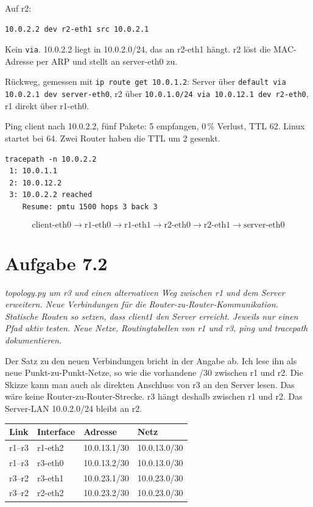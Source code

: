 \documentclass[a4paper,11pt]{article}
\newif\ifexplain
\newcommand{\aufgabe}[1]{\section*{Aufgabe #1}}
\newcommand{\angabe}[1]{{\raggedright\textit{#1}\par}\smallskip}
\newcommand{\explain}[1]{\ifexplain\begin{erklbox}#1\end{erklbox}\fi}
\begin{document}
Auf r2:
\begin{lstlisting}
10.0.2.2 dev r2-eth1 src 10.0.2.1
\end{lstlisting}
Kein \texttt{via}. 10.0.2.2 liegt in 10.0.2.0/24, das an r2-eth1 hängt. r2 löst die MAC-Adresse per ARP und stellt an server-eth0 zu.

Rückweg, gemessen mit \texttt{ip route get 10.0.1.2}: Server über \texttt{default via 10.0.2.1 dev server-eth0}, r2 über \texttt{10.0.1.0/24 via 10.0.12.1 dev r2-eth0}, r1 direkt über r1-eth0.

Ping client nach 10.0.2.2, fünf Pakete: 5 empfangen, 0\,\% Verlust, TTL 62. Linux startet bei 64. Zwei Router haben die TTL um 2 gesenkt.
\begin{lstlisting}
tracepath -n 10.0.2.2
 1: 10.0.1.1
 2: 10.0.12.2
 3: 10.0.2.2 reached
    Resume: pmtu 1500 hops 3 back 3
\end{lstlisting}

\explain{TTL 62 und drei tracepath-Zeilen sagen dasselbe: Client, dann r1, dann r2, dann Server. 10.0.12.2 ist r2-eth0, also der Next Hop, den r1 gewählt hat. Wäre die Route auf r1 falsch, käme der zweite Hop woanders her oder der Ping käme mit Unreachable zurück.}

\[
\boxed{\text{client-eth0}\to\text{r1-eth0}\to\text{r1-eth1}\to\text{r2-eth0}\to\text{r2-eth1}\to\text{server-eth0}}
\]

\aufgabe{7.2}
\angabe{topology.py um r3 und einen alternativen Weg zwischen r1 und dem Server erweitern. Neue Verbindungen für die Router-zu-Router-Kommunikation. Statische Routen so setzen, dass client1 den Server erreicht. Jeweils nur einen Pfad aktiv testen. Neue Netze, Routingtabellen von r1 und r3, ping und tracepath dokumentieren.}

Der Satz zu den neuen Verbindungen bricht in der Angabe ab. Ich lese ihn als neue Punkt-zu-Punkt-Netze, so wie die vorhandene /30 zwischen r1 und r2. Die Skizze kann man auch als direkten Anschluss von r3 an den Server lesen. Das wäre keine Router-zu-Router-Strecke. r3 hängt deshalb zwischen r1 und r2. Das Server-LAN 10.0.2.0/24 bleibt an r2.

\explain{Eine /30 hat vier Adressen: Netz, zwei Hosts, Broadcast. Genau zwei Router, keine Reserve für einen Endhost. Dieselbe Wahl steht schon auf der Strecke r1--r2 in der Vorlage. 10.0.13.0/30 und 10.0.23.0/30 überlappen keines der vorhandenen Netze.}

\begin{center}
\small
\begin{tabular}{@{}llll@{}}
\toprule
Link & Interface & Adresse & Netz \\
\midrule
r1--r3 & r1-eth2 & 10.0.13.1/30 & 10.0.13.0/30 \\
r1--r3 & r3-eth0 & 10.0.13.2/30 & 10.0.13.0/30 \\
r3--r2 & r3-eth1 & 10.0.23.1/30 & 10.0.23.0/30 \\
r3--r2 & r2-eth2 & 10.0.23.2/30 & 10.0.23.0/30 \\
\bottomrule
\end{tabular}
\end{center}
\end{document}
